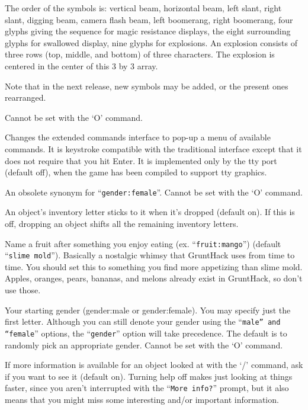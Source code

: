 The order of the symbols is:  vertical beam, horizontal beam, left slant,
right slant, digging beam, camera flash beam, left boomerang, right boomerang,
four glyphs giving the sequence for magic resistance displays,
the eight surrounding glyphs for swallowed display,
nine glyphs for explosions.
An explosion consists of three rows (top, middle, and bottom) of three
characters.  The explosion is centered in the center of this 3 by 3
array.

Note that in the next release, new symbols may be added,
or the present ones rearranged.

Cannot be set with the `O' command.
\item[\tb{extmenu}]
Changes the extended commands interface to pop-up a menu of available commands.  
It is keystroke compatible with the traditional interface except that it does
not require that you hit Enter. It is implemented only by the tty port 
(default off), when the game has been compiled to support tty graphics.
\item[\tb{female}]
An obsolete synonym for ``{\tt gender:female}''.
Cannot be set with the `O' command.
\item[\tb{fixinv}]
An object's inventory letter sticks to it when it's dropped (default on).
If this is off, dropping an object shifts all the remaining inventory letters.
\item[\tb{"fruit   "}]
Name a fruit after something you enjoy eating (ex. ``{\tt fruit:mango}'')
(default ``{\tt slime mold}'').  Basically a nostalgic whimsy that GruntHack uses
from time to time.  You should set this to something you find more
appetizing than slime mold.  Apples, oranges, pears, bananas, and melons
already exist in GruntHack, so don't use those.
\item[\tb{gender}]
Your starting gender (gender:male or gender:female).
You may specify just the first letter.  Although you can
still denote your gender using the ``{\tt male'' and ``female}''
options, the ``{\tt gender}'' option will take precedence.
The default is to randomly pick an appropriate gender.
Cannot be set with the `O' command.
\item[\tb{help}]
If more information is available for an object looked at
with the `/' command, ask if you want to see it (default on). Turning help
off makes just looking at things faster, since you aren't interrupted with the
``{\tt More info?}'' prompt, but it also means that you might miss some
interesting and/or important information.
\item[\tb{horsename}]
